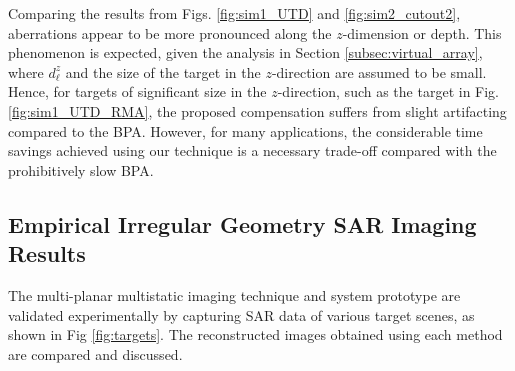 \documentclass{ieeeaccess}
\begin{document}
Comparing the results from Figs. \ref{fig:sim1_UTD} and \ref{fig:sim2_cutout2}, aberrations appear to be more pronounced along the $z$-dimension or depth. 
This phenomenon is expected, given the analysis in Section \ref{subsec:virtual_array}, where $d_\ell^z$ and the size of the target in the $z$-direction are assumed to be small. 
Hence, for targets of significant size in the $z$-direction, such as the target in Fig. \ref{fig:sim1_UTD_RMA}, the proposed compensation suffers from slight artifacting compared to the BPA. 
However, for many applications, the considerable time savings achieved using our technique is a necessary trade-off compared with the prohibitively slow BPA. 

\subsection{Empirical Irregular Geometry SAR Imaging Results}
\label{subsec:real}
The multi-planar multistatic imaging technique and system prototype are validated experimentally by capturing SAR data of various target scenes, as shown in Fig \ref{fig:targets}.
The reconstructed images obtained using each method are compared and discussed.
\end{document}
